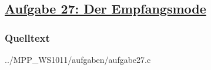 \subsection*
{\href{http://cst.mi.fu-berlin.de/intern/19606-P-MPP/Aufgaben/041101.html}
{Aufgabe 27: Der Empfangsmode}}

\subsubsection*{Quelltext}


{../MPP_WS1011/aufgaben/aufgabe27.c}
